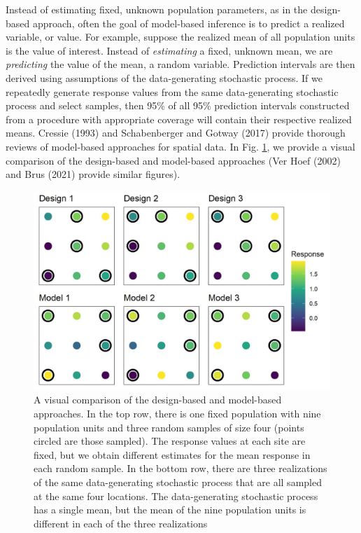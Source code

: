 \documentclass[]{elsarticle} %
\begin{document}
Instead of estimating fixed, unknown population parameters, as in the
design-based approach, often the goal of model-based inference is to
predict a realized variable, or value. For example, suppose the realized
mean of all population units is the value of interest. Instead of
\emph{estimating} a fixed, unknown mean, we are \emph{predicting} the
value of the mean, a random variable. Prediction intervals are then
derived using assumptions of the data-generating stochastic process. If
we repeatedly generate response values from the same data-generating
stochastic process and select samples, then 95\% of all 95\% prediction
intervals constructed from a procedure with appropriate coverage will
contain their respective realized means. Cressie (1993) and
Schabenberger and Gotway (2017) provide thorough reviews of model-based
approaches for spatial data. In Fig. \ref{fig:fig1}, we provide a visual
comparison of the design-based and model-based approaches (Ver Hoef
(2002) and Brus (2021) provide similar figures).

\begin{figure}
  \centering
  \includegraphics[width = 1\linewidth]{figures/dvm_comp.jpeg}
  \caption{A visual comparison of the design-based and model-based approaches. In the top row, there is one fixed population with nine population units and three random samples of size four (points circled are those sampled). The response values at each site are fixed, but we obtain different estimates for the mean response in each random sample. In the bottom row, there are three realizations of the same data-generating stochastic process that are all sampled at the same four locations. The data-generating stochastic process has a single mean, but the mean of the nine population units is different in each of the three realizations}
  \label{fig:fig1}
\end{figure}
\end{document}
